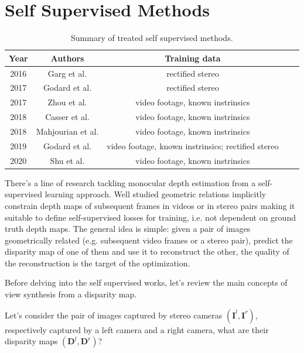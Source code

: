 \newpage
\section{Self Supervised Methods}
\label{s:ssl}


\begin{center}
	\begin{table}
		\begin{tabular}{| c | c | c | c | c |}
		\hline
		\textbf{Year} & \textbf{Authors} & \textbf{Training data} \\
		\hline
		2016 & Garg et al. \cite{Garg} & rectified stereo\\
		2017 & Godard et al. \cite{MonoDepth} & rectified stereo\\
		2017 & Zhou et al. \cite{SfMLearner} & video footage, known instrinsics\\
		2018 & Casser et al. \cite{struct2depth} & video footage, known instrinsics\\
		2018 & Mahjourian et al. \cite{vid2depth} & video footage, known instrinsics\\
		2019 & Godard et al. \cite{MonoDepth2} & video footage, known instrinsics; rectified stereo\\
		2020 & Shu et al. \cite{FeatDepth} & video footage, known instrinsics\\
		\hline
		\end{tabular}
	\caption{Summary of treated self supervised methods. \label{table:3}}
	\end{table}
\end{center}

There's a line of research tackling monocular depth estimation from a self-supervised learning approach.
Well studied geometric relations implicitly constrain depth maps of subsequent frames in videos or in stereo pairs making it suitable to define self-supervised losses for training, i.e. not dependent on ground truth depth maps.
The general idea is simple: given a pair of images geometrically related (e.g. subsequent video frames or a stereo pair), predict the disparity map of one of them and use it to reconstruct the other, the quality of the reconstruction is the target of the optimization.

Before delving into the self supervised works, let's review the main concepts of view synthesis from a disparity map.

Let's consider the pair of images captured by stereo cameras $(\mathbf{I}^{l}, \mathbf{I}^{r})$, respectively captured by a left camera and a right camera, what are their disparity maps $(\mathbf{D}^{l}, \mathbf{D}^{r})$?

